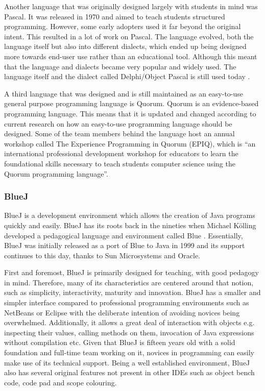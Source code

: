 Another language that was originally designed largely with students in mind was Pascal. It was released in 1970 and aimed to teach students structured programming. However, some early adopters used it far beyond the original intent. This resulted in a lot of work on Pascal. The language evolved, both the language itself but also into different dialects, which ended up being designed more towards end-user use rather than an educational tool. Although this meant that the language and dialects became very popular and widely used. The language itself and the dialect called Delphi/Object Pascal is still used today \cite{tiobe}.

A third language that was designed and is still maintained as an easy-to-use general purpose programming language is Quorum. Quorum is an evidence-based programming language. This means that it is updated and changed according to current research on how an easy-to-use programming language should be designed. Some of the team members behind the language host an annual workshop called The Experience Programming in Quorum (EPIQ), which is ``an international professional development workshop for educators to learn the foundational skills necessary to teach students computer science using the Quorum programming language''\cite{quorum_epiq}.

\subsubsection{BlueJ}
BlueJ is a development environment which allows the creation of Java programs quickly and easily. BlueJ has its roots back in the nineties when Michael Kölling developed a pedagogical language and environment called Blue \cite{bluej_overview}. Essentially, BlueJ was initially released as a port of Blue to Java in 1999 and its support continues to this day, thanks to Sun Microsystems and Oracle.

First and foremost, BlueJ is primarily designed for teaching, with good pedagogy in mind. Therefore, many of its characteristics are centered around that notion, such as simplicity, interactivity, maturity and innovation. BlueJ has a smaller and simpler interface compared to professional programming environments such as NetBeans or Eclipse with the deliberate intention of avoiding novices being overwhelmed. Additionally, it allows a great deal of interaction with objects e.g. inspecting their values, calling methods on them, invocation of Java expressions without compilation etc. Given that BlueJ is fifteen years old with a solid foundation and full-time team working on it, novices in programming can easily make use of its technical support. Being a well established environment, BlueJ also has several original features not present in other IDEs such as object bench code, code pad and scope colouring.	

